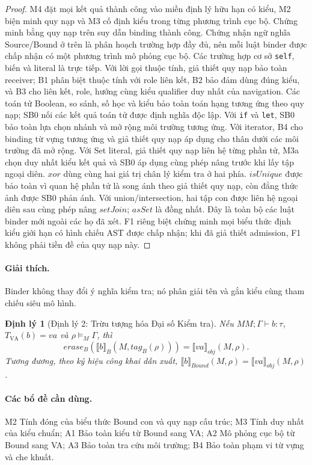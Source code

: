 \documentclass[11pt,a4paper]{article}
\newtheorem{theorem}{Định lý}
\theoremstyle{definition}
\newcommand{\sem}[2]{\llbracket #1 \rrbracket_{#2}}
\begin{document}
\begin{proof}
M4 đặt mọi kết quả thành công vào miền định lý hữu hạn có kiểu, M2 biện minh quy
nạp và M3 cố định kiểu trong từng phương trình cục bộ. Chứng minh bằng quy nạp
trên suy dẫn binding thành công. Chứng nhận ngữ nghĩa Source/Bound ở trên là
phân hoạch trường hợp đầy đủ, nên mỗi luật binder được chấp nhận có một phương
trình mô phỏng cục bộ. Các trường hợp cơ sở \texttt{self}, biến và literal là
trực tiếp. Với lời gọi thuộc tính, giả thiết quy nạp bảo toàn receiver; B1 phân
biệt thuộc tính với role liên kết, B2 bảo đảm dùng đúng kiểu, và B3 cho liên
kết, role, hướng cùng kiểu qualifier duy nhất của navigation. Các toán tử
Boolean, so sánh, số học và kiểu bảo toàn toán hạng tương ứng theo quy nạp; SB0
nối các kết quả toán tử được định nghĩa độc lập. Với \texttt{if} và
\texttt{let}, SB0 bảo toàn lựa chọn nhánh và mở rộng môi trường tương ứng. Với
iterator, B4 cho binding từ vựng tương ứng và giả thiết quy nạp áp dụng cho thân
dưới các môi trường đã mở rộng. Với Set literal, giả thiết quy nạp liên hệ từng
phần tử, M3a chọn duy nhất kiểu kết quả và SB0 áp dụng cùng phép nâng trước
khi lấy tập ngoại diên. $xor$ dùng cùng hai giá trị chân lý kiểm tra ở hai phía.
$isUnique$ được bảo toàn vì quan hệ phần tử là song ánh theo giả thiết quy nạp,
còn đẳng thức ảnh được SB0 phản ánh. Với union/intersection, hai tập con được
liên hệ ngoại diên sau cùng phép nâng $setJoin$; $asSet$ là đồng nhất. Đây là
toàn bộ các luật binder mới ngoài các họ đã xét. F1 riêng biệt chứng minh mọi biểu thức định kiểu
giới hạn có hình chiếu AST được chấp nhận; khi đã giả thiết admission, F1 không
phải tiền đề của quy nạp này.
\end{proof}

\paragraph{Giải thích.}
Binder không thay đổi ý nghĩa kiểm tra; nó phân giải tên và gắn kiểu cùng tham
chiếu siêu mô hình.

\begin{theorem}[Định lý 2: Trừu tượng hóa Đại số Kiểm tra]
Nếu $MM;\Gamma\vdash b:\tau$, $T_{\mathrm{VA}}(b)=va$ và
$\rho\models_M\Gamma$, thì
\[
erase_B(\sem{b}{B}(M,tag_B(\rho)))=\sem{va}{obj}(M,\rho).
\]
Tương đương, theo ký hiệu công khai dẫn xuất,
$\sem{b}{Bound}(M,\rho)=\sem{va}{obj}(M,\rho)$.
\end{theorem}

\paragraph{Các bổ đề cần dùng.}
M2 Tính đóng của biểu thức Bound con và quy nạp cấu trúc; M3 Tính duy nhất của
kiểu chuẩn; A1 Bảo toàn kiểu từ Bound sang VA; A2 Mô phỏng cục bộ từ Bound sang
VA; A3 Bảo toàn tra cứu môi trường; B4 Bảo toàn phạm vi từ vựng và che khuất.
\end{document}
